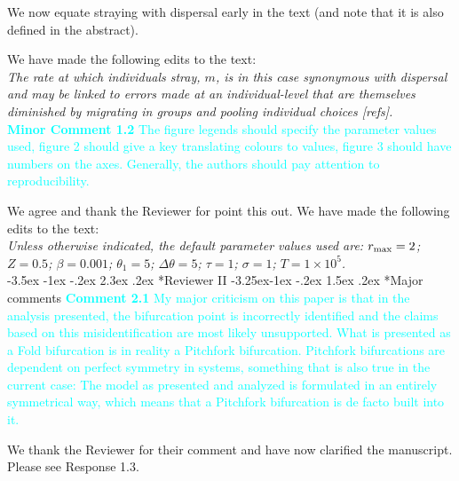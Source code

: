 \documentclass[ucm,12pt]{ucletter}
\makeatletter
\newcounter{section}
\newcounter{subsection}[section]
\renewcommand\section{\@startsection {section}{1}{\z@}%
                                   {-3.5ex \@plus -1ex \@minus -.2ex}%
                                   {2.3ex \@plus.2ex}%
                                   {\normalfont\Large\bfseries}}
\newcommand\subsection{\@startsection{subsection}{2}{\z@}%
                                     {-3.25ex\@plus -1ex \@minus -.2ex}%
                                     {1.5ex \@plus .2ex}%
                                     {\normalfont\large\bfseries}}
\makeatother
\begin{document}
\begin{letter}
 We now equate straying with dispersal early in the text (and note that it is also defined in the abstract).

\noindent We have made the following edits to the text:\\
 \emph{The rate at which individuals stray, $m$, is in this case synonymous with dispersal and may be linked to errors made at an individual-level that are themselves diminished by migrating in groups and pooling individual choices [refs].}\\

\noindent \textcolor{cyan}{
{\bf Minor Comment 1.2} The figure legends should specify the parameter values used, figure 2 should give a key translating colours to values, figure 3 should have numbers on the axes. Generally, the authors should pay attention to reproducibility.}

 We agree and thank the Reviewer for point this out. We have made the following edits to the text:\\
 \emph{Unless otherwise indicated, the default parameter values used are: $r_{\rm max}=2$; $Z=0.5$; $\beta=0.001$; $\theta_1=5$; $\Delta\theta=5$; $\tau=1$; $\sigma=1$; $T=1\times10^5$.}\\


\section*{Reviewer II}
\subsection*{Major comments}
\noindent \textcolor{cyan}{
{\bf Comment 2.1} My major criticism on this paper is that in the analysis presented, the bifurcation point is incorrectly identified and the claims based on this misidentification are most likely unsupported. What is presented as a Fold bifurcation is in reality a Pitchfork bifurcation. Pitchfork bifurcations are dependent on perfect symmetry in systems, something that is also true in the current case: The model as presented and analyzed is formulated in an entirely symmetrical way, which means that a Pitchfork bifurcation is de facto built into it.
}

 We thank the Reviewer for their comment and have now clarified the manuscript. Please see Response 1.3.


\end{letter}
\end{document}
